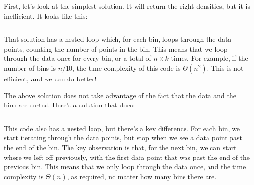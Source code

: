 \begin{progprob}
    \begin{soln}
        First, let's look at the simplest solution. It will return the right
        densities, but it is inefficient. It looks like this:

        \inputminted{python}{\thisdir/include-solution/slow-histogram.py}

        That solution has a nested loop which, for each bin, loops through the
        data points, counting the number of points in the bin. This means that
        we loop through the data once for every bin, or a total of $n \times k$
        times. For example, if the number of bins is $n/10$, the time
        complexity of this code is $\Theta(n^2)$. This is not efficient, and we
        can do better!

        The above solution does not take advantage of the fact that the data
        and the bins are sorted. Here's a solution that does:

        \inputminted{python}{\thisdir/include-solution/histogram.py}

        This code also has a nested loop, but there's a key difference. For
        each bin, we start iterating through the data points, but stop when we
        see a data point past the end of the bin. The key observation is that,
        for the next bin, we can start where we left off previously, with the
        first data point that was past the end of the previous bin. This means
        that we only loop through the data once, and the time complexity is
        $\Theta(n)$, as required, no matter how many bins there are.
    \end{soln}

\end{progprob}
